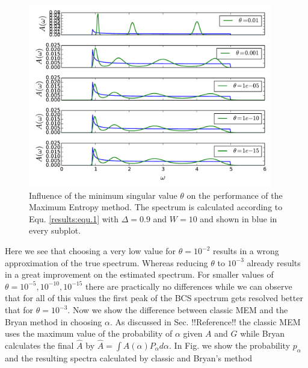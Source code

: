 \begin{figure}[htbp]
	\centering
	\includegraphics[width=0.95\textwidth]{./images/BCS_varying_cutoffs.pdf}
	\caption{Influence of the minimum singular value $\theta$ on the performance of the Maximum Entropy method. The spectrum is calculated according to Equ. \ref{results:equ.1} with $\Delta = 0.9$ and $W = 10$ and shown in blue in every subplot.}
	\label{results:fig.3}
\end{figure}
\FloatBarrier
Here we see that choosing a very low value for $\theta = 10^{-2}$ results in a wrong approximation of the true spectrum. Whereas reducing $\theta$ to $10^{-3}$ already results in a great improvement on the estimated spectrum. For smaller values of $\theta = 10^{-5},10^{-10},10^{-15}$ there are practically no differences while we can observe that for all of this values the first peak of the BCS spectrum gets resolved better that for $\theta = 10^{-3}$.\newline 
Now we show the difference between classic MEM and the Bryan method in choosing $\alpha$. As discussed in Sec. !!Reference!! the classic MEM uses the maximum value of the probability of $\alpha$ given $A$ and $G$ while Bryan calculates the final $\hat{A}$ by  $\hat{A} = \int A(\alpha) P_{\alpha} d\alpha$. In Fig. we show the probability $p_{\alpha}$ and the resulting spectra calculated by classic and Bryan's method
